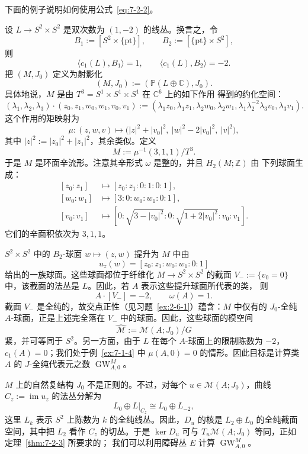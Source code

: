 下面的例子说明如何使用公式~\eqref{eq:7-2-2}。

\begin{example}\label{ex:7-2-5}
设 $L\to S^2\times S^2$ 是双次数为 $(1,-2)$ 的线丛。换言之，令
\[
  B_1:=[S^2\times\{\mathrm{pt}\}],
  \qquad
  B_2:=[\{\mathrm{pt}\}\times S^2],
\]
则
\[
  \langle c_1(L),B_1\rangle=1,
  \qquad
  \langle c_1(L),B_2\rangle=-2.
\]
把 $(M,J_0)$ 定义为射影化
\[
  (M,J_0):=(\mathbb P(L\oplus\mathbb C),J_0).
\]
具体地说，$M$ 是由 $T^3=S^1\times S^1\times S^1$ 在 $\mathbb C^6$ 上的如下作用
得到的约化空间：
\[
  (\lambda_1,\lambda_2,\lambda_3)\cdot
  (z_0,z_1,w_0,w_1,v_0,v_1)
  :=(\lambda_1z_0,\lambda_1z_1,
     \lambda_2w_0,\lambda_2w_1,
     \lambda_1\lambda_2^{-2}\lambda_3v_0,\lambda_3v_1).
\]
这个作用的矩映射为
\[
  \mu:(z,w,v)\longmapsto
  \bigl(|z|^2+|v_0|^2,\ |w|^2-2|v_0|^2,\ |v|^2\bigr),
\]
其中 $|z|^2:=|z_0|^2+|z_1|^2$，其余类似。定义
\[
  M:=\mu^{-1}(3,1,1)/T^3.
\]
于是 $M$ 是环面辛流形。注意其辛形式 $\omega$ 是整的，并且 $H_2(M;\mathbb Z)$ 由
下列球面生成：
\[
\begin{aligned}
  [z_0:z_1]&\longmapsto[z_0:z_1:0:1:0:1],\\
  [w_0:w_1]&\longmapsto[3:0:w_0:w_1:0:1],\\
  [v_0:v_1]&\longmapsto
  [0:\sqrt{3-|v_0|^2}:0:\sqrt{1+2|v_0|^2}:v_0:v_1].
\end{aligned}
\]
它们的辛面积依次为 $3,1,1$。

$S^2\times S^2$ 中的 $B_2$-球面 $w\mapsto(z,w)$ 提升为 $M$ 中由
\[
  u_z(w)=[z_0:z_1:w_0:w_1:0:1]
\]
给出的一族球面。这些球面都位于纤维化 $M\to S^2\times S^2$ 的截面
$V_-:=\{v_0=0\}$ 中，该截面的法丛是 $L$。因此，若 $A$ 表示这些提升球面所代表的类，
则
\[
  A\cdot[V_-]=-2,
  \qquad
  \omega(A)=1.
\]
截面 $V_-$ 是全纯的，故交点正性（见习题~\ref{ex:2-6-1}）蕴含：$M$ 中仅有的
$J_0$-全纯 $A$-球面，正是上述完全落在 $V_-$ 中的球面。因此，这些球面的模空间
\[
  \widehat{\mathcal M}:=\mathcal M(A;J_0)/G
\]
紧，并可等同于 $S^2$。另一方面，由于 $L$ 在每个 $A$-球面上的限制陈数为 $-2$，
$c_1(A)=0$；我们处于例~\ref{ex:7-1-4} 中 $\mu(A,0)=0$ 的情形。因此目标是计算类
$A$ 的 $J$-全纯代表元之数 $\operatorname{GW}^{M}_{A,0}$。

$M$ 上的自然复结构 $J_0$ 不是正则的。不过，对每个 $u\in\mathcal M(A;J_0)$，曲线
$C_z:=\operatorname{im}u_z$ 的法丛分解为
\[
  L_0\oplus L|_{C_z}\cong L_0\oplus L_{-2},
\]
这里 $L_k$ 表示 $S^2$ 上陈数为 $k$ 的全纯线丛。因此，$D_u$ 的核是
$L_2\oplus L_0$ 的全纯截面空间，其中把 $L_2$ 看作 $C_z$ 的切丛。于是
$\ker D_u$ 可与 $T_u\mathcal M(A;J_0)$ 等同，正如定理~\ref{thm:7-2-3} 所要求的；
我们可以利用障碍丛 $E$ 计算 $\operatorname{GW}^{M}_{A,0}$。


\end{example}
